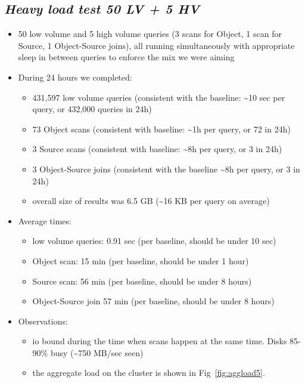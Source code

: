 \documentclass[DM,toc]{lsstdoc}
\begin{document}
\subsection{\texorpdfstring{\textbf{\emph{Heavy load test 50 LV + 5
HV}}}{Heavy load test 50 LV + 5 HV}}\label{heavy-load-test-50-lv-5-hv}

\begin{itemize}
\item
  50 low volume and 5 high volume queries (3 scans for Object, 1 scan
  for Source, 1 Object-Source joins), all running simultaneously with
  appropriate sleep in between queries to enforce the mix we were aiming
\item
  During 24 hours we completed:

  \begin{itemize}
  \item
    431,597 low volume queries (consistent with the baseline:
    \textasciitilde{}10 sec per query, or 432,000 queries in 24h)
  \item
    73 Object scans (consistent with baseline: \textasciitilde{}1h per
    query, or 72 in 24h)
  \item
    3 Source scans (consistent with baseline: \textasciitilde{}8h per
    query, or 3 in 24h)
  \item
    3 Object-Source joins (consistent with the baseline
    \textasciitilde{}8h per query, or 3 in 24h)
  \item
    overall size of results was 6.5 GB (\textasciitilde{}16 KB per query
    on average)
  \end{itemize}
\item
  Average times:

  \begin{itemize}
  \item
    low volume queries: 0.91 sec (per baseline, should be under 10 sec)
  \item
    Object scan: 15 min (per baseline, should be under 1 hour)
  \item
    Source scan: 56 min (per baseline, should be under 8 hours)
  \item
    Object-Source join 57 min (per baseline, should be under 8 hours)
  \end{itemize}
\item
  Observations:

  \begin{itemize}
  \item
    io bound during the time when scans happen at the same time. Disks
    85-90\% busy (\textasciitilde{}750 MB/sec seen)
  \item
    the aggregate load on the
    cluster is shown in Fig~\ref{fig:aggload5}.
  \end{itemize}
\end{itemize}
\end{document}
